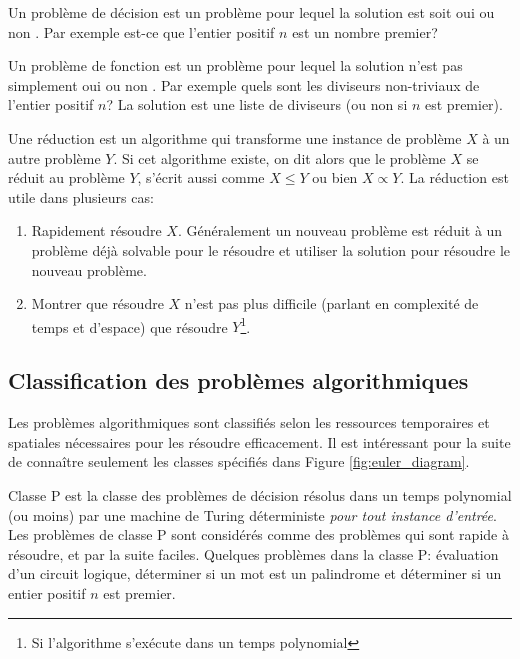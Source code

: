 \documentclass[../main.tex]{subfiles}
\begin{document}
\begin{definition}
Un problème de décision est un problème pour lequel la solution est soit \og oui \fg{} ou \og non \fg{}. Par exemple est-ce que l'entier positif $n$ est un nombre premier?
\end{definition}

\begin{definition}
Un problème de fonction est un problème pour lequel la solution n'est pas simplement \og oui \fg{} ou \og non \fg{}. Par exemple quels sont les diviseurs non-triviaux de l'entier positif $n$? La solution est une liste de diviseurs (ou non si $n$ est premier).
\end{definition}

\begin{definition}
Une réduction est un algorithme qui transforme une instance de problème $X$ à un autre problème $Y$. Si cet algorithme existe, on dit alors que le problème $X$ se réduit au problème $Y$, s'écrit aussi comme $X \leq Y$ ou bien $X \propto Y$. La réduction est utile dans plusieurs cas:
\begin{enumerate}
\item Rapidement résoudre $X$. Généralement un nouveau problème est réduit à un problème déjà solvable pour le résoudre et utiliser la solution pour résoudre le nouveau problème.
\item Montrer que résoudre $X$ n'est pas plus difficile (parlant en complexité de temps et d'espace) que résoudre $Y$\footnote{Si l'algorithme s'exécute dans un temps polynomial}.
\end{enumerate}
\end{definition}

\subsection{Classification des problèmes algorithmiques}
Les problèmes algorithmiques sont classifiés selon les ressources temporaires et spatiales nécessaires pour les résoudre efficacement. Il est intéressant pour la suite de connaître seulement les classes spécifiés dans Figure \ref{fig:euler_diagram}.

\begin{definition}
Classe P est la classe des problèmes de décision résolus dans un temps polynomial (ou moins) par une machine de Turing déterministe \emph{pour tout instance d'entrée}. Les problèmes de classe P sont considérés comme des problèmes qui sont rapide à résoudre, et par la suite faciles. Quelques problèmes dans la classe P: évaluation d'un circuit logique, déterminer si un mot est un palindrome et déterminer si un entier positif $n$ est premier.
\end{definition}
\end{document}
